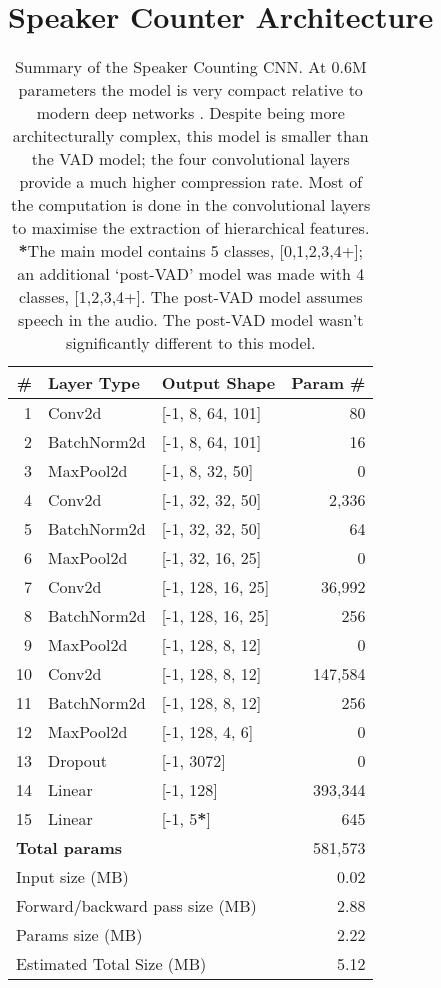 \section{Speaker Counter Architecture}
\label{app:SC_arc}
\begin{table}[H]
\centering
\begin{tabular}{|r l l r|}
\hline
\textbf{\#} & \textbf{Layer Type} & \textbf{Output Shape} & \textbf{Param \#} \\
\hline
1  & Conv2d       & [-1, 8, 64, 101]   & 80 \\
2  & BatchNorm2d  & [-1, 8, 64, 101]   & 16 \\
3  & MaxPool2d    & [-1, 8, 32, 50]    & 0 \\
4  & Conv2d       & [-1, 32, 32, 50]   & 2,336 \\
5  & BatchNorm2d  & [-1, 32, 32, 50]   & 64 \\
6  & MaxPool2d    & [-1, 32, 16, 25]   & 0 \\
7  & Conv2d       & [-1, 128, 16, 25]  & 36,992 \\
8  & BatchNorm2d  & [-1, 128, 16, 25]  & 256 \\
9  & MaxPool2d    & [-1, 128, 8, 12]   & 0 \\
10 & Conv2d       & [-1, 128, 8, 12]   & 147,584 \\
11 & BatchNorm2d  & [-1, 128, 8, 12]   & 256 \\
12 & MaxPool2d    & [-1, 128, 4, 6]    & 0 \\
13 & Dropout      & [-1, 3072]         & 0 \\
14 & Linear       & [-1, 128]          & 393,344 \\
15 & Linear       & [-1, 5\textbf{*}]            & 645 \\
\hline
\multicolumn{3}{|l|}{\textbf{Total params}}         & 581,573 \\
\hline
\multicolumn{3}{|l|}{Input size (MB)}                 & 0.02 \\
\multicolumn{3}{|l|}{Forward/backward pass size (MB)} & 2.88 \\
\multicolumn{3}{|l|}{Params size (MB)}                & 2.22 \\
\multicolumn{3}{|l|}{Estimated Total Size (MB)}       & 5.12 \\
\hline
\end{tabular}
\caption{Summary of the Speaker Counting CNN. At 0.6M parameters the model is very compact relative to modern deep networks \cite{modelsizes}. Despite being more architecturally complex, this model is smaller than the VAD model; the four convolutional layers provide a much higher compression rate. Most of the computation is done in the convolutional layers to maximise the extraction of hierarchical features. \newline \newline \textbf{*}The main model contains 5 classes, [0,1,2,3,4+]; an additional `post-VAD' model was made with 4 classes, [1,2,3,4+]. The post-VAD model assumes speech in the audio. The post-VAD model wasn't significantly different to this model.}
\end{table}

